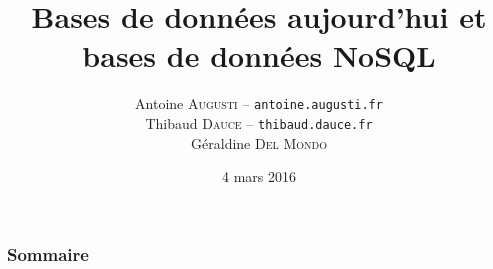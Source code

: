 \documentclass[handout]{beamer}
\title{
	Bases de données aujourd'hui et bases de données NoSQL
}
\author{
	Antoine \textsc{Augusti} -- \texttt{antoine.augusti.fr} \\
	\vspace{5px}
	Thibaud \textsc{Dauce} -- \texttt{thibaud.dauce.fr} \\
	\vspace{5px}
	Géraldine \textsc{Del Mondo} \\
}
\date{4 mars 2016}
\begin{document}
	\begin{frame}[plain]
		\titlepage
	\end{frame}

	\begin{frame}[plain]
		\frametitle{Sommaire}
		\tableofcontents
	\end{frame}

		

		

		

		
\end{document}
